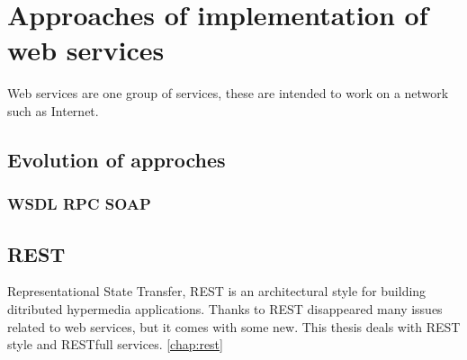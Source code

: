 \section{Approaches of implementation of web services}
Web services are one group of services, these are intended to work on a network such as Internet.

\subsection{Evolution of approches}
\subsubsection{WSDL RPC SOAP} 
 
\subsection{REST}

Representational State Transfer, REST is an architectural style for building ditributed hypermedia applications.
Thanks to REST disappeared many issues related to web services, but it comes with some new. This thesis deals with REST style and RESTfull services. \ref{chap:rest}

    

